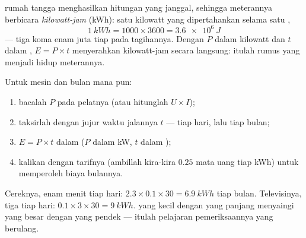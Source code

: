 \begin{definition}\label{def:g9:electric-power-energy:kwh}
 rumah tangga menghasilkan hitungan  yang janggal, sehingga
meterannya berbicara \emph{kilowatt-jam}
(\unit{kWh}):  satu kilowatt yang dipertahankan selama satu ,
\[
\qty{1}{kWh} = 1000 \times 3600 = \qty{3.6e6}{J}
\]
--- tiga koma enam juta  tiap  pada tagihannya. Dengan $P$
dalam kilowatt dan $t$ dalam , $E = P \times t$ menyerahkan
kilowatt-jam secara langsung: itulah rumus yang menjadi hidup
meterannya.
\end{definition}

\begin{method}\label{met:g9:electric-power-energy:audit}
Untuk mesin dan bulan mana pun:
\begin{enumerate}
  \item bacalah  $P$ pada pelatnya (atau hitunglah
        $U \times I$);
  \item taksirlah dengan jujur waktu jalannya $t$ --- tiap hari, lalu
        tiap bulan;
  \item $E = P \times t$ dalam  ($P$ dalam \unit{kW}, $t$
        dalam );
  \item kalikan dengan tarifnya (ambillah kira-kira $0.25$  mata
        uang tiap \unit{kWh}) untuk memperoleh biaya bulannya.
\end{enumerate}
Cereknya, enam menit tiap hari: $2.3 \times 0.1 \times 30 =
\qty{6.9}{kWh}$ tiap bulan. Televisinya, tiga  tiap hari:
$0.1 \times 3 \times 30 = \qty{9}{kWh}$.  yang kecil dengan 
yang panjang menyaingi  yang besar dengan  yang pendek ---
itulah pelajaran pemeriksaannya yang berulang.
\end{method}


